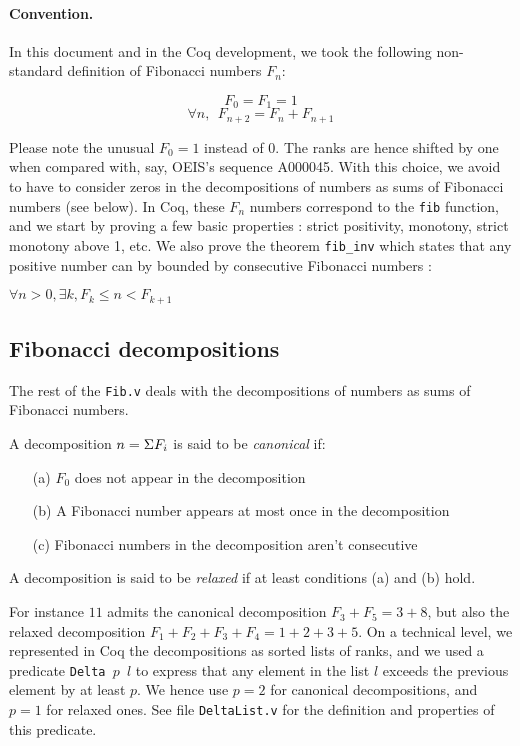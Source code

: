 \documentclass[a4paper,11pt]{article}
\begin{document}
\paragraph{Convention.} In this document and in the Coq development,
we took the following non-standard definition of Fibonacci numbers
$F_n$:

$$F_0 = F_1 = 1$$
$$\forall n,~~ F_{n+2} = F_{n}+F_{n+1}$$

Please note the unusual $F_0 = 1$ instead of $0$. The ranks are hence
shifted by one when compared with, say, OEIS's sequence A000045.
With this choice, we avoid to have to consider zeros in the
decompositions of numbers as sums of Fibonacci numbers (see
below). In Coq, these $F_n$ numbers correspond to the {\tt fib}
function, and we start by proving a few basic properties :
strict positivity, monotony, strict monotony above 1, etc.
We also prove the theorem {\tt fib\_inv} which states 
that any positive number can by bounded by
consecutive Fibonacci numbers :

\begin{theorem}\label{fibinv}
$\forall n>0, \exists k, F_k \le n < F_{k+1}$
\end{theorem}

\subsection{Fibonacci decompositions} The rest of the {\tt Fib.v}
deals with the decompositions of numbers as sums of Fibonacci
numbers.
\begin{definition}
 A decomposition $n = \Sigma F_i$ is said to be \emph{canonical} if:
\begin{itemize}
\item[(a)] $F_0$ does not appear in the decomposition
\item[(b)] A Fibonacci number appears at most once in the decomposition
\item[(c)] Fibonacci numbers in the decomposition aren't consecutive
\end{itemize}
A decomposition is said to be \emph{relaxed} if at least conditions
(a) and (b) hold. 
\end{definition}
For instance $11$ admits the canonical decomposition
$F_3+F_5 = 3 + 8$, but also the relaxed decomposition $F_1+F_2+F_3+F_4
= 1 + 2 + 3 + 5$.
On a technical level, we represented in Coq the decompositions
as sorted lists of ranks, and we used a predicate {\tt Delta $p$ $l$}
to express that any element in the list $l$ exceeds the previous
element by at least $p$. We hence use $p=2$ for canonical
decompositions, and $p=1$ for relaxed ones. See file
{\tt DeltaList.v} for the definition and properties of this
predicate.
\end{document}
